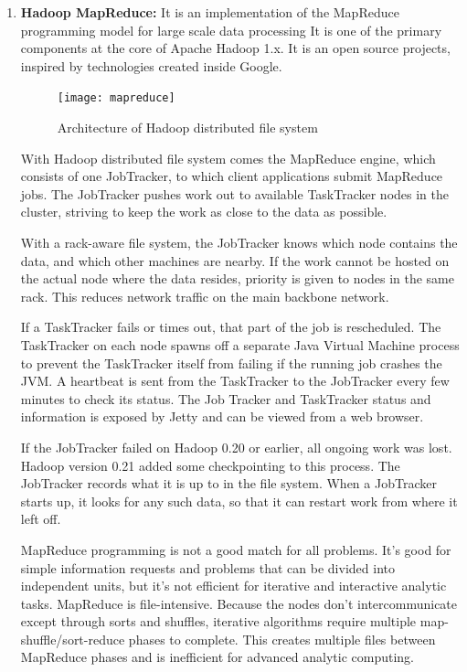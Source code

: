 \documentclass[conference]{IEEEtran}
\begin{document}
\begin{enumerate}
        \item \textbf{Hadoop MapReduce:}
                It is an implementation of the MapReduce programming model for large scale data processing
It is one of the primary components at the core of Apache Hadoop 1.x. It is an open source projects, inspired by technologies created inside Google.
\begin{figure}[h!]
        \centering
        \texttt{[image: mapreduce]}
        \caption{Architecture of Hadoop distributed file system}
\end{figure}
With Hadoop distributed file system comes the MapReduce engine, which consists of one JobTracker, to which client applications submit MapReduce jobs.
The JobTracker pushes work out to available TaskTracker nodes in the cluster, striving to keep the work as close to the data as possible.
\par With a rack-aware file system, the JobTracker knows which node contains the data, and which other machines are nearby. If the work cannot be hosted on the actual node where the data resides, priority is given to nodes in the same rack. This reduces network traffic on the main backbone network.
\par If a TaskTracker fails or times out, that part of the job is rescheduled. The TaskTracker on each node spawns off a separate Java Virtual Machine process to prevent the TaskTracker itself from failing if the running job crashes the JVM. A heartbeat is sent from the TaskTracker to the JobTracker every few minutes to check its status. The Job Tracker and TaskTracker status and information is exposed by Jetty and can be viewed from a web browser.
\par If the JobTracker failed on Hadoop 0.20 or earlier, all ongoing work was lost. Hadoop version 0.21 added some checkpointing to this process. The JobTracker records what it is up to in the file system. When a JobTracker starts up, it looks for any such data, so that it can restart work from where it left off.
\par MapReduce programming is not a good match for all problems. It’s good for simple information requests and problems that can be divided into independent units, but it's not efficient for iterative and interactive analytic tasks. MapReduce is file-intensive. Because the nodes don’t intercommunicate except through sorts and shuffles, iterative algorithms require multiple map-shuffle/sort-reduce phases to complete. This creates multiple files between MapReduce phases and is inefficient for advanced analytic computing.


\end{enumerate}
\end{document}
